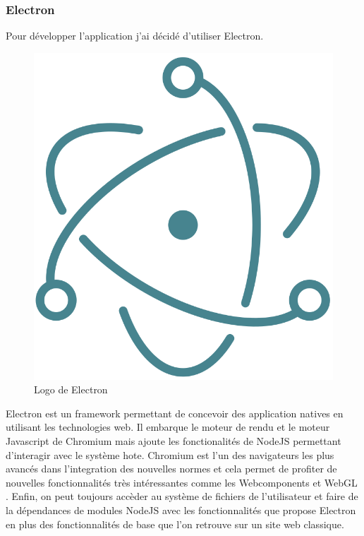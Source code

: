 \subsubsection{Electron}

Pour développer l'application j'ai décidé d'utiliser Electron.

\begin{figure}[h]
    \centering
    \includegraphics[scale=0.2]{img/electron.png}
    \caption{Logo de Electron}
\end{figure}

Electron est un framework permettant de concevoir des application natives en utilisant les technologies web.
Il embarque le moteur de rendu et le moteur Javascript de Chromium mais ajoute les fonctionalités de NodeJS permettant d'interagir avec le système hote.
Chromium est l'un des navigateurs les plus avancés dans l'integration des nouvelles normes et cela permet de profiter de nouvelles fonctionnalités très intéressantes comme les Webcomponents et WebGL .
Enfin, on peut toujours accèder au système de fichiers de l'utilisateur et faire de la dépendances de modules NodeJS avec les fonctionnalités que propose Electron en plus des fonctionnalités de base que l'on retrouve sur un site web classique.


